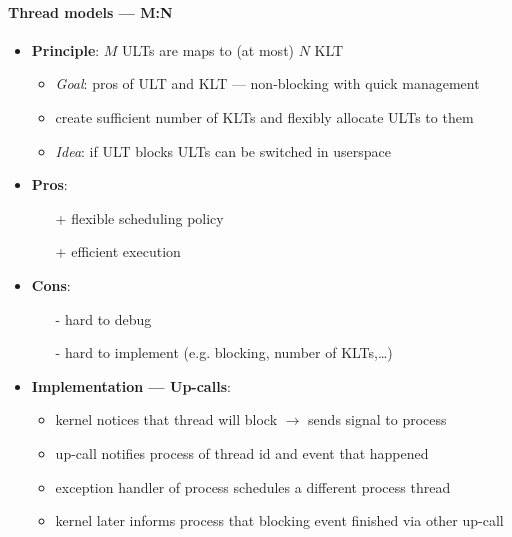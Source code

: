 \paragraph{Thread models --- M:N}
\begin{itemize}
  \item \textbf{Principle}: \( M \) ULTs are maps to (at most) \( N \) KLT
  \begin{itemize}
    \item \emph{Goal}: pros of ULT and KLT --- non-blocking with quick management
    \item create sufficient number of KLTs and flexibly allocate ULTs to them
    \item \emph{Idea}: if ULT blocks ULTs can be switched in userspace
  \end{itemize}
  \item \textbf{Pros}:
  \begin{itemize}
    \item[+] flexible scheduling policy
    \item[+] efficient execution
  \end{itemize}
  \item \textbf{Cons}:
  \begin{itemize}
    \item[-] hard to debug
    \item[-] hard to implement (e.g. blocking, number of KLTs,\dots)
  \end{itemize}
  \item \textbf{Implementation --- Up-calls}:
  \begin{itemize}
    \item kernel notices that thread will block \( \to \) sends signal to process
    \item up-call notifies process of thread id and event that happened
    \item exception handler of process schedules a different process thread
    \item kernel later informs process that blocking event finished via other up-call
  \end{itemize}
\end{itemize}

